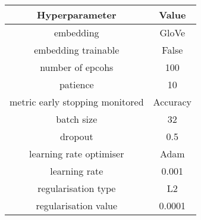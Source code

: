 \begin{tabular}{c|c}
\hline
    \textbf{Hyperparameter} & \textbf{Value} \\
\hline
    embedding & GloVe \\
\hline
    embedding trainable & False \\
\hline
    number of epcohs & 100 \\
\hline
    patience &  10 \\
\hline
    metric early stopping monitored & Accuracy \\
\hline
    batch size & 32 \\
\hline
    dropout & 0.5 \\
\hline
    learning rate optimiser & Adam \\
\hline
    learning rate & 0.001 \\
\hline
    regularisation type & L2 \\
\hline
    regularisation value & 0.0001 \\
\hline
\end{tabular}